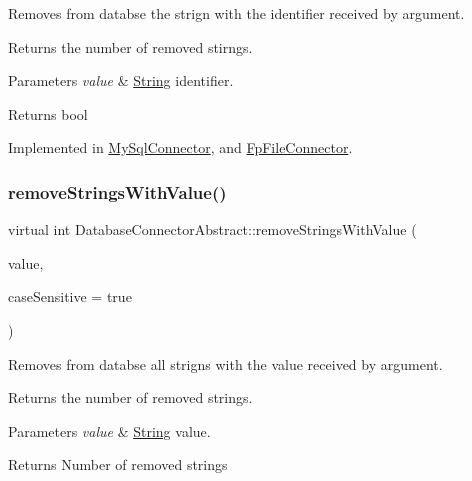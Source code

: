 Removes from databse the strign with the identifier received by argument. 

Returns the number of removed stirngs. 
\begin{DoxyParams}{Parameters}
{\em value} & \mbox{\hyperlink{classString}{String}} identifier. \\
\hline
\end{DoxyParams}
\begin{DoxyReturn}{Returns}
bool 
\end{DoxyReturn}


Implemented in \mbox{\hyperlink{classMySqlConnector_a3c340e5310c56410d64ecd89e5cf6661}{My\+Sql\+Connector}}, and \mbox{\hyperlink{classFpFileConnector_a8e09804b3c21f6b56dcc70659bbf105f}{Fp\+File\+Connector}}.

\mbox{\label{classDatabaseConnectorAbstract_af482c0b4af4488c5897c04d0c4dff906}} 
\subsubsection{\texorpdfstring{remove\+Strings\+With\+Value()}{removeStringsWithValue()}}
{\footnotesize\ttfamily virtual int Database\+Connector\+Abstract\+::remove\+Strings\+With\+Value (\begin{DoxyParamCaption}\item[{const Q\+String \&}]{value,  }\item[{bool}]{case\+Sensitive = {\ttfamily true} }\end{DoxyParamCaption})\hspace{0.3cm}{\ttfamily [pure virtual]}}



Removes from databse all strigns with the value received by argument. 

Returns the number of removed strings. 
\begin{DoxyParams}{Parameters}
{\em value} & \mbox{\hyperlink{classString}{String}} value. \\
\hline
\end{DoxyParams}
\begin{DoxyReturn}{Returns}
Number of removed strings 
\end{DoxyReturn}


